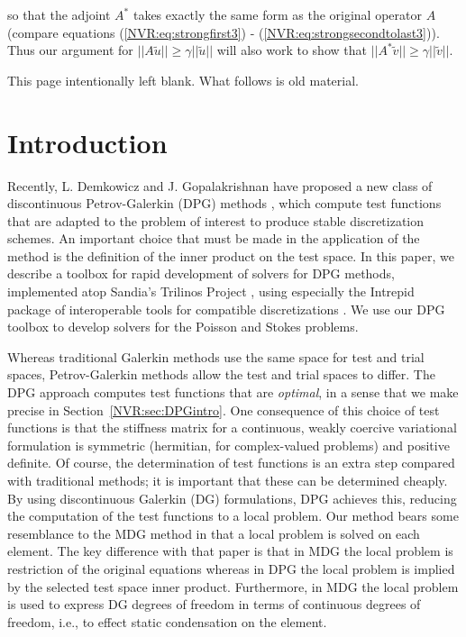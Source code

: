 so that the adjoint $A^{*}$ takes exactly the same form as the original operator $A$ (compare equations (\ref{NVR:eq:strongfirst3}) - (\ref{NVR:eq:strongsecondtolast3})).  Thus our argument for $||A \tilde{u}|| \geq \gamma ||\tilde{u}||$ will also work to show that $||A^{*} \tilde{v}|| \geq \gamma ||\tilde{v}||$.





\pagebreak

This page intentionally left blank.  What follows is old material.
\pagebreak

\section{Introduction}\label{NVR:sec:intro}
Recently, L. Demkowicz and J. Gopalakrishnan have proposed a new class of discontinuous Petrov-Galerkin (DPG) methods \cite{DPG1,DPG2,DPG3,DPG4,DPG5}, which compute test functions that are adapted to the problem of interest to produce stable discretization schemes.  An important choice that must be made in the application of the method is the definition of the inner product on the test space.  In this paper, we describe a toolbox for rapid development of solvers for DPG methods, implemented atop Sandia's Trilinos Project \cite{Trilinos}, using especially the Intrepid package of interoperable tools for compatible discretizations \cite{Intrepid}.  We use our DPG toolbox to develop solvers for the Poisson and Stokes problems.

Whereas traditional Galerkin methods use the same space for test and trial spaces, Petrov-Galerkin methods allow the test and trial spaces to differ.  The DPG approach computes test functions that are \emph{optimal}, in a sense that we make precise in Section~\ref{NVR:sec:DPGintro}.  One consequence of this choice of test functions is that the stiffness matrix for a continuous, weakly coercive variational formulation is symmetric (hermitian, for complex-valued problems) and positive definite.  Of course, the determination of test functions is an extra step compared with traditional methods; it is important that these can be determined cheaply.  By using discontinuous Galerkin (DG) formulations, DPG achieves this, reducing the computation of the test functions to a local problem.  Our method bears some resemblance to the MDG method \cite{Hughes} in that a local problem is solved on each element. The key difference with that paper is that in MDG the local problem is restriction of the original equations whereas in DPG the local problem is implied by the selected test space inner product. Furthermore, in MDG the local problem is used to express DG degrees of freedom in terms of continuous degrees of freedom, i.e., to effect static condensation on the element.

